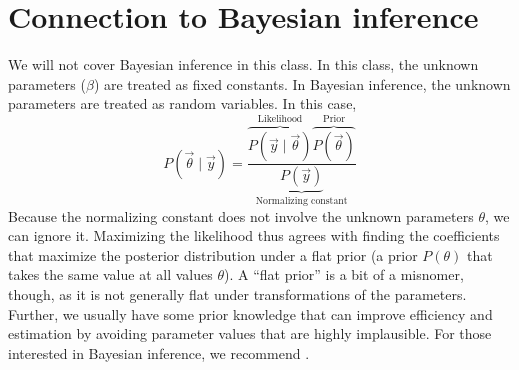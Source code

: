 \documentclass[11pt]{article}
\begin{document}
\section{Connection to Bayesian inference}
\label{bayes}
We will not cover Bayesian inference in this class. In this class, the unknown parameters ($\beta$) are treated as fixed constants. In Bayesian inference, the unknown parameters are treated as random variables. In this case, 
$$P(\vec\theta\mid \vec{y}) = \frac{\overbrace{P(\vec{y}\mid \vec\theta)}^\text{Likelihood}\overbrace{P(\vec\theta)}^\text{Prior}}{\underbrace{P(\vec{y})}_\text{Normalizing constant}}$$
Because the normalizing constant does not involve the unknown parameters $\theta$, we can ignore it. Maximizing the likelihood thus agrees with finding the coefficients that maximize the posterior distribution under a flat prior (a prior $P(\theta)$ that takes the same value at all values $\theta$). A ``flat prior'' is a bit of a misnomer, though, as it is not generally flat under transformations of the parameters. Further, we usually have some prior knowledge that can improve efficiency and estimation by avoiding parameter values that are highly implausible. For those interested in Bayesian inference, we recommend \citet{gelman2014}.


\end{document}
